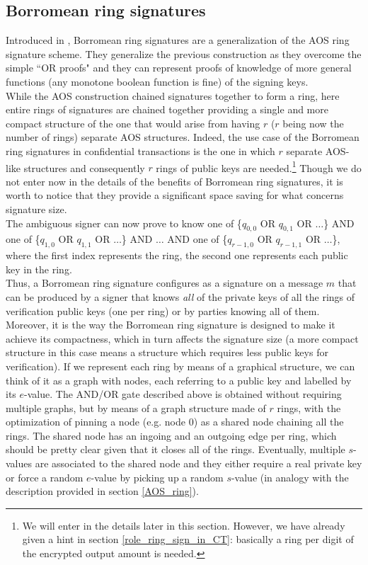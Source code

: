 \subsection{Borromean ring signatures}
Introduced in \cite{Borromean}, Borromean ring signatures are a generalization of the AOS ring signature scheme. They generalize the previous construction as they overcome the simple ``OR proofs" and they can represent proofs of knowledge of more general functions (any monotone boolean function is fine) of the signing keys.\\
While the AOS construction chained signatures together to form a ring, here entire rings of signatures are chained together providing a single and more compact structure of the one that would arise from having $r$ ($r$ being now the number of rings) separate AOS structures. Indeed, the use case of the Borromean ring signatures in confidential transactions is the one in which $r$ separate AOS-like structures and consequently $r$ rings of public keys are needed.\footnote{We will enter in the details later in this section. However, we have already given a hint in section \ref{role_ring_sign_in_CT}: basically a ring per digit of the encrypted output amount is needed.} Though we do not enter now in the details of the benefits of Borromean ring signatures, it is worth to notice that they provide a significant space saving for what concerns signature size.\\
The ambiguous signer can now prove to know one of \{$q_{0,0}$ OR $q_{0,1}$ OR $\dots$\} AND one of \{$q_{1,0}$ OR $q_{1,1}$ OR $\dots$\} AND $\dots$ AND one of \{$q_{{r-1},{0}}$ OR $q_{{r-1},{1}}$ OR $\dots$\}, where the first index represents the ring, the second one represents each public key in the ring.\\
Thus, a Borromean ring signature configures as a signature on a message $m$ that can be produced by a signer that knows \textit{all} of the private keys of all the rings of verification public keys (one per ring) or by parties knowing all of them.\\
Moreover, it is the way the Borromean ring signature is designed to make it achieve its compactness, which in turn affects the signature size (a more compact structure in this case means a structure which requires less public keys for verification). If we represent each ring by means of a graphical structure, we can think of it as a graph with nodes, each referring to a public key and labelled by its $e$-value. The AND/OR gate described above is obtained without requiring multiple graphs, but by means of a graph structure made of $r$ rings, with the optimization of pinning a node (e.g. node 0) as a shared node chaining all the rings. The shared node has an ingoing and an outgoing edge per ring, which should be pretty clear given that it closes all of the rings. Eventually, multiple $s$-values are associated to the shared node and they either require a real private key or force a random $e$-value by picking up a random $s$-value (in analogy with the description provided in section \ref{AOS_ring}).\\
